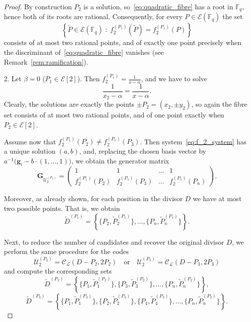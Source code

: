 \documentclass[sn-mathphys-num]{sn-jnl_modified}
\newcommand{\FF}{\ensuremath{\mathbb{F}}}
\begin{document}
\begin{proof}
By construction $P_2$ is a solution, so~\eqref{eq:quadratic_fibre} has a root in $\FF_q$, hence both of its roots are rational. Consequently, for every $P \in \mathcal{E}(\FF_q)$ the set
\[
\left\{\widetilde{P} \in \mathcal{E}(\FF_q) \;:\; f_2^{(P_1)}(\widetilde{P}) = f_2^{(P_1)}(P)\right\}
\]
consists of at most two rational points, and of exactly one point precisely when the discriminant of~\eqref{eq:quadratic_fibre} vanishes (see Remark~\ref{rem:ramification}).

2. Let $\beta = 0$ ($P_1 \in \mathcal{E}[2]$). Then $f_2^{(P_1)} = \frac{1}{x-\alpha}$, and we have to solve
\begin{equation}\label{eq:eq_probability_2}
\frac{1}{x_2 - \alpha} = \frac{1}{x - \alpha} .
\end{equation}
Clearly, the solutions are exactly the points $\pm P_2 = (x_2, \pm y_2)$, so again the fibre set consists of at most two rational points, and of one point exactly when $P_2 \in \mathcal{E}[2]$.


Assume now that $f_2^{(P_1)}(P_2) \neq f_2^{(P_1)}(P_3)$. Then system~\eqref{eq:f_2_system} has a unique solution $(a,b)$, and, replacing the chosen basis vector by $a^{-1}\bigl(\mathbf{g}_i - b \cdot (1,\dots,1)\bigr)$, we obtain the generator matrix
\begin{equation}\label{eq:f2_basis}
\mathbf{G}_{\mathcal{U}_2^{(P_1)}} =
\begin{pmatrix}
1 & 1 & \dots & 1\\
f_2^{(P_1)}(P_2) & f_2^{(P_1)}(P_3) & \dots & f_2^{(P_1)}(P_n)
\end{pmatrix}.
\end{equation}












 
Moreover, as already shown, for each position in the divisor $D$ we have at most two possible points. That is, we obtain
\[
\widetilde{D}^{(P_1)} = \left\{\{P_2, \widetilde{P}_2^{(P_1)}\}, \dots, \{P_{n}, \widetilde{P}_{n}^{(P_1)}\}\right\}.
\]


Next, to reduce the number of candidates and recover the original divisor $D$, we perform the same procedure for the codes
\[
\mathcal{U}_2^{(P_2)} = \mathcal{C}_\mathscr{L}(D -  P_2, 2P_2) \quad \text{or} \quad \mathcal{U}_2^{(P_3)} = \mathcal{C}_\mathscr{L}(D -  P_3, 2P_3)
\]
and compute the corresponding sets
\[
\widetilde{D}^{(P_2)}= \left\{\{P_1, \widetilde{P}_1^{(P_2)}\}, \{P_3, \widetilde{P}_3^{(P_2)}\}, \dots, \{P_{n}, \widetilde{P}_{n}^{(P_2)}\}\right\},
\]
\[
\widetilde{D}^{(P_3)} = \left\{\{P_1, \widetilde{P}_1^{(P_3)}\}, \{P_2, \widetilde{P}_2^{(P_3)}\}, \{P_4, \widetilde{P}_4^{(P_3)}\}, \dots, \{P_{n}, \widetilde{P}_{n}^{(P_3)}\}\right\}.
\]





\end{proof}
\end{document}
